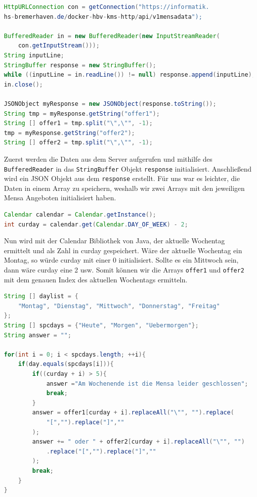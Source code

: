 \begin{lstlisting}[language=Java, caption={Auslesen der Mensa-API}]
HttpURLConnection con = getConnection("https://informatik.
hs-bremerhaven.de/docker-hbv-kms-http/api/v1mensadata");

BufferedReader in = new BufferedReader(new InputStreamReader(
    con.getInputStream()));
String inputLine;
StringBuffer response = new StringBuffer();
while ((inputLine = in.readLine()) != null) response.append(inputLine); 
in.close();

JSONObject myResponse = new JSONObject(response.toString());
String tmp = myResponse.getString("offer1");
String [] offer1 = tmp.split("\",\"", -1);
tmp = myResponse.getString("offer2");
String [] offer2 = tmp.split("\",\"", -1); 
\end{lstlisting}

Zuerst werden die Daten aus dem Server aufgerufen und mithilfe des \verb|BufferedReader| in das \verb|StringBuffer| Objekt \verb|response| initialisiert. Anschließend wird ein JSON Objekt aus dem \verb|response| erstellt. Für uns war es leichter, die Daten in einem Array zu speichern, weshalb wir zwei Arrays mit den jeweiligen Mensa Angeboten initialisiert haben.\\

\begin{lstlisting}[language=Java, caption={Kalenderfunktion in Java}]
Calendar calendar = Calendar.getInstance();
int curday = calendar.get(Calendar.DAY_OF_WEEK) - 2;    
\end{lstlisting}

Nun wird mit der Calendar Bibliothek von Java, der aktuelle Wochentag ermittelt und als Zahl in curday gespeichert. Wäre der aktuelle Wochentag ein Montag, so würde curday mit einer 0 initialisiert. Sollte es ein Mittwoch sein, dann wäre curday eine 2 usw. Somit können wir die Arrays \verb|offer1| und \verb|offer2| mit dem genauen Index des aktuellen Wochentags ermitteln.\\

\begin{lstlisting}[language=Java, caption={Ermittlung der Mensadaten für heute, morgen und übermorgen}]
String [] daylist = {
    "Montag", "Dienstag", "Mittwoch", "Donnerstag", "Freitag"
};
String [] spcdays = {"Heute", "Morgen", "Uebermorgen"};
String answer = "";

for(int i = 0; i < spcdays.length; ++i){
    if(day.equals(spcdays[i])){
        if((curday + i) > 5){
            answer ="Am Wochenende ist die Mensa leider geschlossen";
            break;
        }
        answer = offer1[curday + i].replaceAll("\"", "").replace(
            "[","").replace("]",""
        );
        answer += " oder " + offer2[curday + i].replaceAll("\"", "")
            .replace("[","").replace("]",""
        );
        break;
    }
}    
\end{lstlisting}

